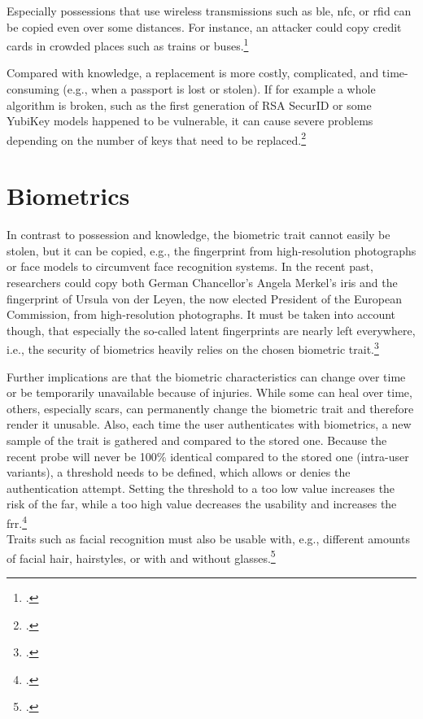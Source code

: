 Especially possessions that use wireless transmissions such as \gls{ble}, \gls{nfc}, or \gls{rfid} can be copied even over some distances. For instance, an attacker could copy credit cards in crowded places such as trains or buses.\footcite[See][]{6892730}

Compared with knowledge, a replacement is more costly, complicated, and time-consuming (e.g., when a passport is lost or stolen). If for example a whole algorithm is broken, such as the first generation of RSA SecurID or some YubiKey models happened to be vulnerable, it can cause severe problems depending on the number of keys that need to be replaced.\footcites[See][18]{dasgupta2017multi}[See][]{BIRYUKOV2005364}[See][]{yubikey-heise}

\section{Biometrics}

In contrast to possession and knowledge, the biometric trait cannot easily be stolen, but it can be copied, e.g., the fingerprint from high-resolution photographs or 
face models to circumvent face recognition systems. In the recent past, researchers could copy both German Chancellor's Angela Merkel's iris and the fingerprint of Ursula von der Leyen, the now elected President of the European Commission, from high-resolution photographs. It must be taken into account though, that especially the so-called latent fingerprints are nearly left everywhere, i.e., the security of biometrics heavily relies on the chosen biometric trait.\footcites[See][]{185181}[See][]{220566}[See][e199]{MARTIN2013e189}[See][]{ccc-merkel}

Further implications are that the biometric characteristics can change over time or be temporarily unavailable because of injuries. While some can heal over time, others, especially scars, can permanently change the biometric trait and therefore render it unusable. Also, each time the user authenticates with biometrics, a new sample of the trait is gathered and compared to the stored one. Because the recent probe will never be 100\% identical compared to the stored one (\frqq intra-user variants\flqq), a threshold needs to be defined, which allows or denies the authentication attempt. Setting the threshold to a too low value increases the risk of the \gls{far}, while a too high value decreases the usability and increases the \gls{frr}.\footcite[See][13--17, 52]{Jain2011}\\Traits such as facial recognition must also be usable with, e.g., different amounts of facial hair, hairstyles, or with and without glasses.\footcite[See][98]{Jain2011}

